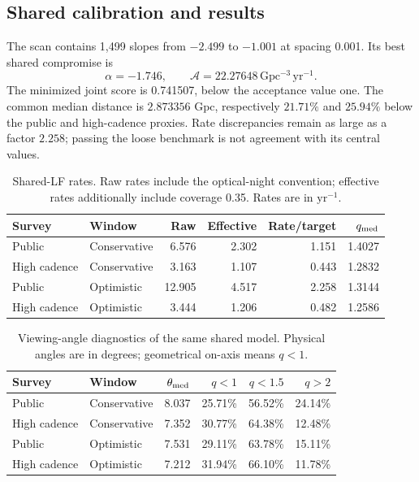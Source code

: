 
\subsection{Shared calibration and results}
The scan contains 1,499 slopes from $-2.499$ to $-1.001$
at spacing 0.001. Its best shared compromise is
\begin{equation}
\boxed{\alpha=-1.746,\qquad
\mathcal A=22.27648\,\mathrm{Gpc^{-3}\,yr^{-1}}.}
\end{equation}
The minimized joint score is 0.741507, below the acceptance value one.
The common median distance is $2.873356$ Gpc, respectively $21.71\%$
and $25.94\%$ below the public and high-cadence proxies. Rate discrepancies
remain as large as a factor $2.258$; passing the loose benchmark is not agreement
with its central values.
\begin{table}[H]\centering\small
\renewcommand{\arraystretch}{1.15}
\caption{Shared-LF rates. Raw rates include the optical-night convention; effective rates additionally include coverage 0.35. Rates are in $\mathrm{yr^{-1}}$.}
\begin{tabular}{@{}llrrrr@{}}
\toprule
Survey & Window & Raw & Effective & Rate/target & $q_{\rm med}$ \\\midrule
Public & Conservative & 6.576 & 2.302 & 1.151 & 1.4027 \\
High cadence & Conservative & 3.163 & 1.107 & 0.443 & 1.2832 \\
Public & Optimistic & 12.905 & 4.517 & 2.258 & 1.3144 \\
High cadence & Optimistic & 3.444 & 1.206 & 0.482 & 1.2586 \\
\bottomrule\end{tabular}\end{table}
\begin{table}[H]\centering\small
\renewcommand{\arraystretch}{1.15}
\caption{Viewing-angle diagnostics of the same shared model. Physical angles are in degrees; geometrical on-axis means $q<1$.}
\begin{tabular}{@{}llrrrr@{}}
\toprule
Survey & Window & $\theta_{\rm med}$ & $q<1$ & $q<1.5$ & $q>2$ \\\midrule
Public & Conservative & 8.037 & 25.71\% & 56.52\% & 24.14\% \\
High cadence & Conservative & 7.352 & 30.77\% & 64.38\% & 12.48\% \\
Public & Optimistic & 7.531 & 29.11\% & 63.78\% & 15.11\% \\
High cadence & Optimistic & 7.212 & 31.94\% & 66.10\% & 11.78\% \\
\bottomrule\end{tabular}\end{table}
